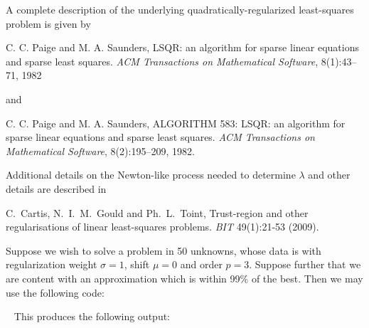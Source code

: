 \documentclass{galahad}
\begin{document}
\galreferences
A complete description of the underlying quadratically-regularized
least-squares problem is given by
\vspace*{1mm}

\noindent
C. C. Paige and M. A. Saunders,
LSQR: an algorithm for sparse linear equations and sparse least  squares.
{\em ACM Transactions on Mathematical Software}, 8(1):43--71, 1982

\noindent
and

\noindent
C. C. Paige and M. A. Saunders,
ALGORITHM 583: LSQR: an algorithm for sparse linear equations and
  sparse least squares.
{\em ACM Transactions on Mathematical Software}, 8(2):195--209, 1982.

\noindent
Additional details on the Newton-like process needed to determine $\lambda$ and
other details are described in
\vspace*{1mm}

\noindent
C.\ Cartis, N.\ I.\ M.\ Gould and Ph.\ L.\ Toint,
Trust-region and other regularisations of linear
least-squares problems.
{\em BIT} 49(1):21-53 (2009).


\galexample
Suppose we wish to solve a problem in 50 unknowns, whose data is
with regularization weight $\sigma = 1$, shift $\mu = 0$ and order $p = 3$.
Suppose further that we are content with
an approximation which is within 99\% of the best.
Then we may use the following code:

{\tt \small
\VerbatimInput{\packageexample}
}
\noindent
This produces the following output:
{\tt \small
\VerbatimInput{\packageresults}
}
\end{document}
